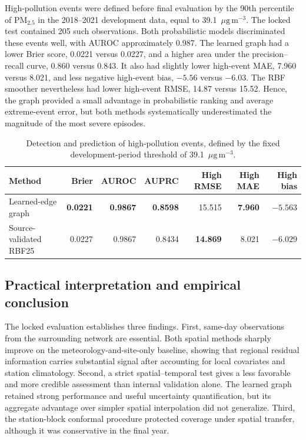 High-pollution events were defined before final evaluation by the 90th percentile of PM$_{2.5}$ in the 2018--2021 development data, equal to 39.1~$\mu\mathrm{g}\,\mathrm{m}^{-3}$. The locked test contained 205 such observations. Both probabilistic models discriminated these events well, with AUROC approximately 0.987. The learned graph had a lower Brier score, 0.0221 versus 0.0227, and a higher area under the precision--recall curve, 0.860 versus 0.843. It also had slightly lower high-event MAE, 7.960 versus 8.021, and less negative high-event bias, $-5.56$ versus $-6.03$. The RBF smoother nevertheless had lower high-event RMSE, 14.87 versus 15.52. Hence, the graph provided a small advantage in probabilistic ranking and average extreme-event error, but both methods systematically underestimated the magnitude of the most severe episodes.

\begin{table}[htbp]
\centering
\caption{Detection and prediction of high-pollution events, defined by the fixed development-period threshold of 39.1~$\mu\mathrm{g}\,\mathrm{m}^{-3}$.}
\label{tab:po_high_events}
\begin{tabular}{lrrrrrr}
\toprule
Method & Brier & AUROC & AUPRC & High RMSE & High MAE & High bias \\
\midrule
Learned-edge graph & \textbf{0.0221} & \textbf{0.9867} & \textbf{0.8598} & 15.515 & \textbf{7.960} & \textbf{$-5.563$} \\
Source-validated RBF25 & 0.0227 & 0.9867 & 0.8434 & \textbf{14.869} & 8.021 & $-6.029$ \\
\bottomrule
\end{tabular}
\end{table}

\subsection{Practical interpretation and empirical conclusion}
\label{subsec:po_interpretation}

The locked evaluation establishes three findings. First, same-day observations from the surrounding network are essential. Both spatial methods sharply improve on the meteorology-and-site-only baseline, showing that regional residual information carries substantial signal after accounting for local covariates and station climatology. Second, a strict spatial--temporal test gives a less favorable and more credible assessment than internal validation alone. The learned graph retained strong performance and useful uncertainty quantification, but its aggregate advantage over simpler spatial interpolation did not generalize. Third, the station-block conformal procedure protected coverage under spatial transfer, although it was conservative in the final year.

